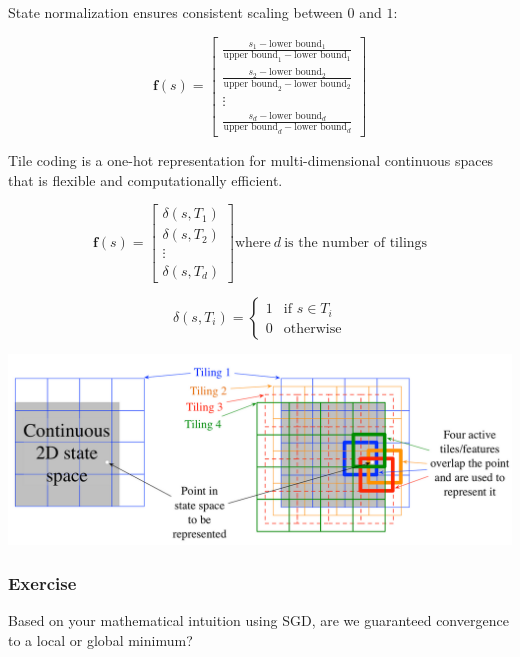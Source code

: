 \documentclass[
  letterpaper,
  DIV=11,
  numbers=noendperiod]{scrreprt}
\begin{document}
State normalization ensures consistent scaling between \(0\) and \(1\):

\[
\mathbf{f}(s) = \begin{bmatrix}
\frac{s_1 - \text{lower bound}_{1}}{\text{upper bound}_{1} - \text{lower bound}_{1}} \\
\frac{s_2 - \text{lower bound}_{2}}{\text{upper bound}_{2} - \text{lower bound}_{2}} \\
\vdots \\
\frac{s_d - \text{lower bound}_{d}}{\text{upper bound}_{d} - \text{lower bound}_{d}}
\end{bmatrix}
\]

Tile coding is a one-hot representation for multi-dimensional continuous
spaces that is flexible and computationally efficient.

\[
\mathbf{f}(s) = \begin{bmatrix}
\delta(s, T_1) \\
\delta(s, T_2) \\
\vdots \\
\delta(s, T_d)
\end{bmatrix}
\text{where} \ d \ \text{is the number of tilings} 
\]

\[
\delta(s, T_i) = 
\begin{cases} 
1 & \text{if } s \in T_i \\ 
0 & \text{otherwise} 
\end{cases}
\]

\begin{center}
\includegraphics[width=0.9\linewidth,height=\textheight,keepaspectratio]{lecture7/images/tilecoding.png}
\end{center}

\subsubsection{Exercise}\label{exercise-11}

Based on your mathematical intuition using SGD, are we guaranteed
convergence to a local or global minimum?
\end{document}
